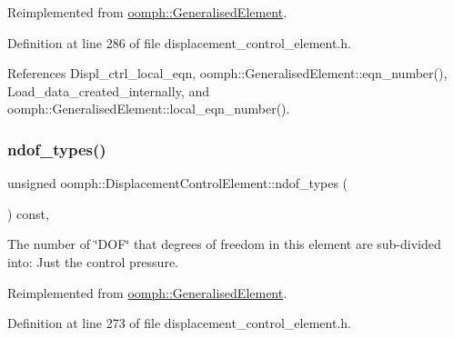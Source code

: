 Reimplemented from \hyperlink{classoomph_1_1GeneralisedElement_a069f59bfc3e607a5bebba52c6314d777}{oomph\+::\+Generalised\+Element}.



Definition at line 286 of file displacement\+\_\+control\+\_\+element.\+h.



References Displ\+\_\+ctrl\+\_\+local\+\_\+eqn, oomph\+::\+Generalised\+Element\+::eqn\+\_\+number(), Load\+\_\+data\+\_\+created\+\_\+internally, and oomph\+::\+Generalised\+Element\+::local\+\_\+eqn\+\_\+number().

\mbox{\label{classoomph_1_1DisplacementControlElement_aceec0d8fd80fc5d50451e99680306d1a}} 
\subsubsection{\texorpdfstring{ndof\+\_\+types()}{ndof\_types()}}
{\footnotesize\ttfamily unsigned oomph\+::\+Displacement\+Control\+Element\+::ndof\+\_\+types (\begin{DoxyParamCaption}{ }\end{DoxyParamCaption}) const\hspace{0.3cm}{\ttfamily [inline]}, {\ttfamily [virtual]}}



The number of \char`\"{}\+D\+O\+F\char`\"{} that degrees of freedom in this element are sub-\/divided into\+: Just the control pressure. 



Reimplemented from \hyperlink{classoomph_1_1GeneralisedElement_a0c6037a870597b35dcf1c780710b9a56}{oomph\+::\+Generalised\+Element}.



Definition at line 273 of file displacement\+\_\+control\+\_\+element.\+h.

\mbox{\label{classoomph_1_1DisplacementControlElement_af6a93fc12b436e69cf5a95e9e35ca8e1}} 
